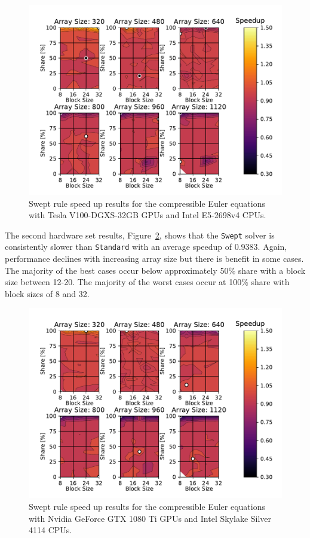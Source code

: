 \documentclass[review]{elsarticle}
\def\oldCPU{s}
\def\oldGPU{s}
\def\newCPU{s}
\def\newGPU{s}
\def\Swept{\texttt{Swept}}
\def\Standard{\texttt{Standard}}
\def\oldCPU{Intel Skylake Silver 4114} %
\def\oldGPU{Nvidia GeForce GTX 1080 Ti}
\def\newCPU{Intel E5-2698v4} %
\def\newGPU{Tesla V100-DGXS-32GB}
\begin{document}
\begin{figure}[htb!]
    \centering
    \includegraphics[scale=0.7]{figs/speedUpeulerNew.pdf}
    \caption{Swept rule speed up results  for the compressible Euler equations with \newGPU{} GPUs and \newCPU{} CPUs.}
    \label{fig:newSpeedupEuler}
\end{figure}

The second hardware set results, Figure~\ref{fig:oldSpeedupEuler}, shows that the \Swept{} solver is consistently slower than \Standard{} with an average speedup of 0.9383. Again, performance declines with increasing array size but there is benefit in some cases. The majority of the best cases occur below approximately 50\% share with a block size between 12-20. The majority of the worst cases occur at 100\% share with block sizes of 8 and 32.

\begin{figure}[htb!]
    \centering
    \includegraphics[scale=0.7]{figs/speedUpeulerOld.pdf}
    \caption{Swept rule speed up results  for the compressible Euler equations with \oldGPU{} GPUs and \oldCPU{} CPUs.}
    \label{fig:oldSpeedupEuler}
\end{figure}
\end{document}
